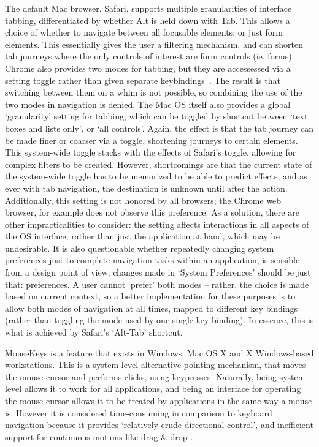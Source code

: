\documentclass[11pt,openright,a4paper]{report}
\begin{document}
The default Mac browser, Safari, supports multiple granularities of interface tabbing, differentiated by whether Alt is held down with Tab\cite{safaria11y}. This allows a choice of whether to navigate between all focusable elements, or just form elements. This essentially gives the user a filtering mechanism, and can shorten tab journeys where the only controls of interest are form controls (ie, forms). Chrome also provides two modes for tabbing, but they are accessessed via a setting toggle rather than given separate keybindings~\cite{browserkeyboardaccess}. The result is that switching between them on a whim is not possible, so combining the use of the two modes in navigation is denied.
The Mac OS itself also provides a global `granularity' setting for tabbing, which can be toggled by shortcut between `text boxes and lists only', or `all controls'\cite{macshortcuts}. Again, the effect is that the tab journey can be made finer or coarser via a toggle, shortening journeys to certain elements. This system-wide toggle stacks with the effects of Safari's toggle, allowing for complex filters to be created. However, shortcomings are that the current state of the system-wide toggle has to be memorized to be able to predict effects, and as ever with tab navigation, the destination is unknown until after the action. Additionally, this setting is not honored by all browsers; the Chrome web browser, for example does not observe this preference\cite{browserkeyboardaccess}.
As a solution, there are other impracticalities to consider: the setting affects interactions in all aspects of the OS interface, rather than just the application at hand, which may be undesirable. It is also questionable whether repeatedly changing system preferences just to complete navigation tasks within an application, is sensible from a design point of view; changes made in `System Preferences' should be just that: preferences. A user cannot `prefer' both modes -- rather, the choice is made based on current context, so a better implementation for these purposes is to allow both modes of navigation at all times, mapped to different key bindings (rather than toggling the mode used by one single key binding). In essence, this is what is achieved by Safari's `Alt-Tab' shortcut.

MouseKeys is a feature that exists in Windows, Mac OS X and X Windows-based workstations. This is a system-level alternative pointing mechanism, that moves the mouse cursor and performs clicks, using keypresses. Naturally, being system-level allows it to work for all applications, and being an interface for operating the mouse cursor allows it to be treated by applications in the same way a mouse is. However it is considered time-consuming in comparison to keyboard navigation because it provides `relatively crude directional control', and inefficient support for continuous motions like drag \& drop \cite{bergman1995towards}.
\end{document}
